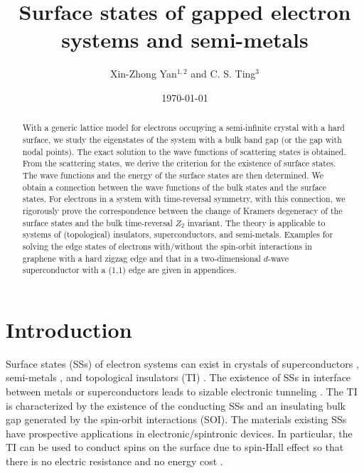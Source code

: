 \documentclass[aps,pra,amsmath,twocolumn,showpacs,bibnotes,10pt]{revtex4-1}
\begin{document}
\title{Surface states of gapped electron systems and semi-metals}

\author{Xin-Zhong Yan$^{1,2}$ and C. S. Ting$^3$}
\address{$^1$Beijing National Laboratory for Condensed Matter Physics, Institute of Physics, Chinese Academy of Sciences, Beijing 100190, China}
\address{$^2$Beijing Key Laboratory for Advanced Functional Materials and Structure Research, Beijing 100190, China} 
\address{$^3$Texas Center for Superconductivity, University of Houston, Houston, Texas 77204, USA}

\date{\today}

\begin{abstract}
With a generic lattice model for electrons occupying a semi-infinite crystal with a hard surface, we study the eigenstates of the system with a bulk band gap (or the gap with nodal points). The exact solution to the wave functions of scattering states is obtained. From the scattering states, we derive the criterion for the existence of surface states. The wave functions and the energy of the surface states are then determined. We obtain a connection between the wave functions of the bulk states and the surface states. For electrons in a system with time-reversal symmetry, with this connection, we rigorously prove the correspondence between the change of Kramers degeneracy of the surface states and the bulk time-reversal $Z_2$ invariant. The theory is applicable to systems of (topological) insulators, superconductors, and semi-metals. Examples for solving the edge states of electrons with/without the spin-orbit interactions in graphene with a hard zigzag edge and that in a two-dimensional $d$-wave superconductor with a (1,1) edge are given in appendices.
\end{abstract}

\maketitle

\section{Introduction}

Surface states (SSs) of electron systems \cite{Tamm,Shockley} can exist in crystals of superconductors \cite{Thuneberg,Hu,Sauls}, semi-metals \cite{Fujita,Nakada,Wakabayashi}, and topological insulators (TI) \cite{Murakami,Sinova,Kane,Qi,HZhang,Hsieh,Hasan}. The existence of SSs in interface between metals or superconductors leads to sizable electronic tunneling \cite{Tanaka,Yan,Wimmer}. The TI is characterized by the existence of the conducting SSs and an insulating bulk gap generated by the spin-orbit interactions (SOI). The materials existing SSs have prospective applications in electronic/spintronic devices. In particular, the TI can be used to conduct spins on the surface due to spin-Hall effect so that there is no electric resistance and no energy cost \cite{Murakami,Sinova,Kane,Kane2,Sheng,Wu,Xu,Bernevig2,Konig}.
\end{document}
